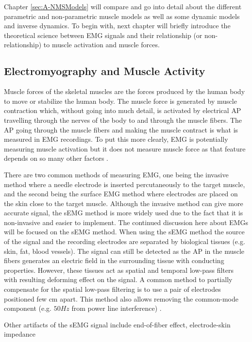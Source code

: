 Chapter \ref{sec:A-NMSModels} will compare and go into detail about the different parametric and non-parametric muscle models as well as some dynamic models and inverse dynamics.
To begin with, next chapter will briefly introduce the theoretical science between \ac{EMG} signals and their relationship (or non-relationship) to muscle activation and muscle forces.

\subsection{Electromyography and Muscle Activity}
\label{sec:A-EMG}
Muscle forces of the skeletal muscles are the forces produced by the human body to move or stabilize the human body. 
The muscle force is generated by muscle contraction which, without going into much detail, is activated by electrical \ac{AP} travelling through the nerves of the body to and through the muscle fibers. 
The \ac{AP} going through the muscle fibers and making the muscle contract is what is measured in \ac{EMG} recordings.
To put this more clearly, \ac{EMG} is potentially measuring muscle activation but it does not measure muscle force as that feature depends on so many other factors \cite{Enoka2016}.

There are two common methods of measuring EMG, one being the invasive method where a needle electrode is inserted percutaneously to the target muscle, and the second being the surface EMG method where electrodes are placed on the skin close to the target muscle. 
Although the invasive method can give more accurate signal, the \ac{sEMG} method is more widely used due to the fact that it is non-invasive and easier to implement. 
The continued discussion here about \ac{EMG}s will be focused on the \ac{sEMG} method.
When using the \ac{sEMG} method the source of the signal and the recording electrodes are separated by biological tissues (e.g. skin, fat, blood vessels).
The signal can still be detected as the \ac{AP} in the muscle fibers generates an electric field in the surrounding tissue with conducting properties.
However, these tissues act as spatial and temporal low-pass filters with resulting deforming effect on the signal.
A common method to partially compensate for the spatial low-pass filtering is to use a pair of electrodes positioned few cm apart.
This method also allows removing the common-mode component (e.g. $50Hz$ from power line interference) \cite{Farina2016}.

Other artifacts of the \ac{sEMG} signal include end-of-fiber effect, electrode-skin impedance

